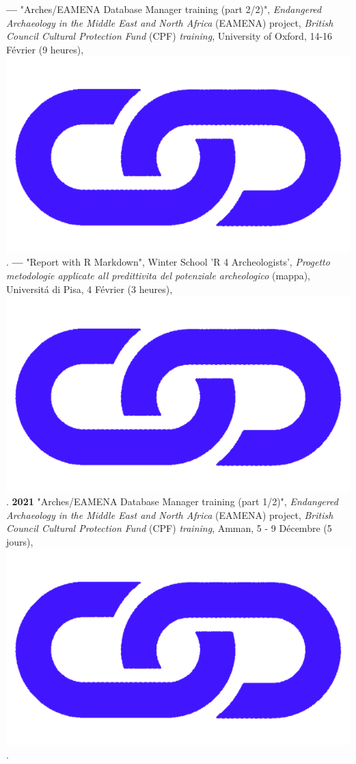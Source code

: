 \documentclass{article}
\begin{document}
\textbf{--- }"Arches/EAMENA Database Manager training (part 2/2)", \textit{Endangered Archaeology in the Middle East and North Africa} (EAMENA) project, \textit{British Council Cultural Protection Fund} (CPF) \textit{training}, University of Oxford, 14-16 Février (9 heures), \href{https://github.com/eamena-oxford/eamena-arches-dev/tree/main/training#readme}{\includegraphics[scale=0.02]{link_darkblue.png}}.
\smallbreak
\textbf{--- }"Report with R Markdown", Winter School 'R 4 Archeologists', \textit{Progetto metodologie applicate all predittivita del potenziale archeologico} (mappa), Universit\'{a} di Pisa, 4 Février (3 heures), \href{https://github.com/zoometh/thomashuet/tree/main/profiles/oxford/R4A#readme}{\includegraphics[scale=0.02]{link_darkblue.png}}.
\smallbreak
\textbf{2021 }"Arches/EAMENA Database Manager training (part 1/2)", \textit{Endangered Archaeology in the Middle East and North Africa} (EAMENA) project, \textit{British Council Cultural Protection Fund} (CPF) \textit{training}, Amman, 5 - 9 Décembre (5 jours), \href{https://github.com/eamena-oxford/eamena-arches-dev/tree/main/training#readme}{\includegraphics[scale=0.02]{link_darkblue.png}}.
\end{document}
